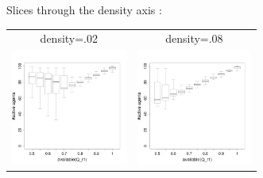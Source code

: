 \documentclass[8pt, handout=show,notes=show]{beamer}
\begin{document}
\begin{frame}{ Slices through the density axis : }

	\renewcommand{\imgSize}{3.8cm}	
	\begin{table}[H]

		\centering
		\begin{tabular}{cc}
			density=.02&density=.08\\
			\includegraphics[width=\imgSize]{images/alive_r1_density-2.png}&
			\includegraphics[width=\imgSize]{images/alive_r1_density-8.png}\\

\end{tabular}
\end{table}
\end{frame}
\end{document}
